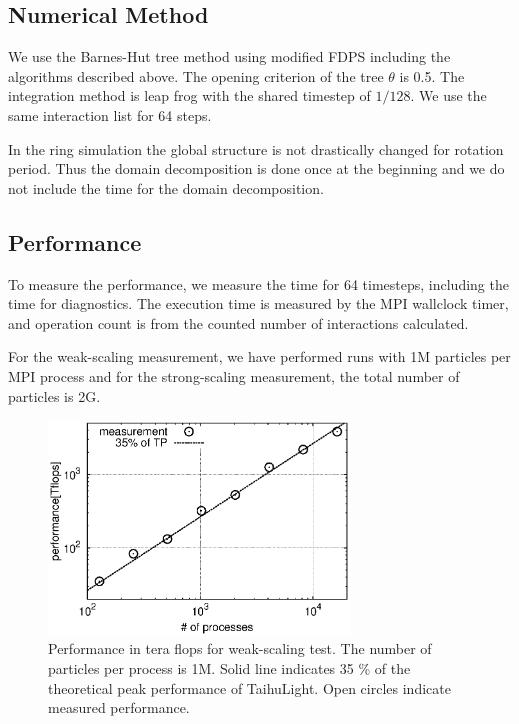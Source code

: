 \documentclass[oribibl]{llncs}
\begin{document}
\subsection{Numerical Method}

We use the Barnes-Hut tree method using modified FDPS including the
algorithms described above. The opening criterion of the tree $\theta$
is 0.5. The integration method is leap frog with the shared timestep
of $1/128$. We use the same interaction list for 64 steps.

In the ring simulation the global structure is not drastically changed
for rotation period. Thus the domain decomposition is done once at the
beginning and we do not include the time for the domain decomposition.


\subsection{Performance}

To measure the performance, we measure the time for 64 timesteps,
including the time for diagnostics. The execution time is measured by
the MPI wallclock timer, and operation count is from the counted
number of interactions calculated.

For the weak-scaling measurement, we have performed runs with 1M
particles per MPI process and for the strong-scaling measurement, the
total number of particles is 2G.

\begin{figure}
  \centering
    \includegraphics[width=8cm,clip]{./fig/weak_speed.eps}
  \caption{Performance in tera flops for weak-scaling test. The number
    of particles per process is 1M. Solid line indicates 35 \% of the
    theoretical peak performance of TaihuLight. Open circles indicate
    measured performance.}
  \label{fig:weakpf}
\end{figure}
\end{document}
